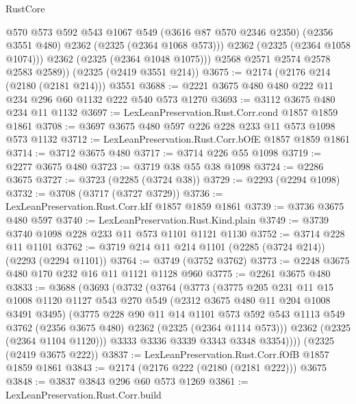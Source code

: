 \begin{lexlean}{RustCore}
\begin{coremodule}
              @570
              @573
              @592
              @543
              @1067
              @549
              (@3616 @87 @570 @2346 @2350)
              (@2356 @3551 @480)
              @2362
              (@2325 (@2364 @1068 @573)))
            @2362
            (@2325 (@2364 @1058 @1074)))
          @2362
          (@2325 (@2364 @1048 @1075)))
        @2568
        @2571
        @2574
        @2578
        @2583
        @2589))
    (@2325 (@2419 @3551 @214))
@3675 := @2174 (@2176 @214 (@2180 (@2181 @214))) @3551
@3688 := @2221 @3675 @480 @480 @222 @11 @234 @296 @60 @1132 @222 @540 @573 @1270
@3693 := @3112 @3675 @480 @234 @11 @1132
@3697 := LexLeanPreservation.Rust.Corr.cond @1857 @1859 @1861
@3708 := @3697 @3675 @480 @597 @226 @228 @233 @11 @573 @1098 @573 @1132
@3712 := LexLeanPreservation.Rust.Corr.bOfE @1857 @1859 @1861
@3714 := @3712 @3675 @480
@3717 := @3714 @226 @55 @1098
@3719 := @2277 @3675 @480
@3723 := @3719 @38 @55 @38 @1098
@3724 := @2286 @3675
@3727 := @3723 (@2285 (@3724 @38))
@3729 := @2293 (@2294 @1098)
@3732 := @3708 (@3717 (@3727 @3729))
@3736 := LexLeanPreservation.Rust.Corr.kIf @1857 @1859 @1861
@3739 := @3736 @3675 @480 @597
@3740 := LexLeanPreservation.Rust.Kind.plain
@3749 := @3739 @3740 @1098 @228 @233 @11 @573 @1101 @1121 @1130
@3752 := @3714 @228 @11 @1101
@3762 := @3719 @214 @11 @214 @1101 (@2285 (@3724 @214)) (@2293 (@2294 @1101))
@3764 := @3749 (@3752 @3762)
@3773 := @2248 @3675 @480 @170 @232 @16 @11 @1121 @1128 @960
@3775 := @2261 @3675 @480
@3833 := @3688
    (@3693
      (@3732
        (@3764
          (@3773
            (@3775
              @205
              @231
              @11
              @15
              @1008
              @1120
              @1127
              @543
              @270
              @549
              (@2312 @3675 @480 @11 @204 @1008 @3491 @3495)
              (@3775
                @228
                @90
                @11
                @14
                @1101
                @573
                @592
                @543
                @1113
                @549
                @3762
                (@2356 @3675 @480)
                @2362
                (@2325 (@2364 @1114 @573)))
              @2362
              (@2325 (@2364 @1104 @1120)))
            @3333
            @3336
            @3339
            @3343
            @3348
            @3354))))
    (@2325 (@2419 @3675 @222))
@3837 := LexLeanPreservation.Rust.Corr.fOfB @1857 @1859 @1861
@3843 := @2174 (@2176 @222 (@2180 (@2181 @222))) @3675
@3848 := @3837 @3843 @296 @60 @573 @1269
@3861 := LexLeanPreservation.Rust.Corr.build

\end{coremodule}
\end{lexlean}
